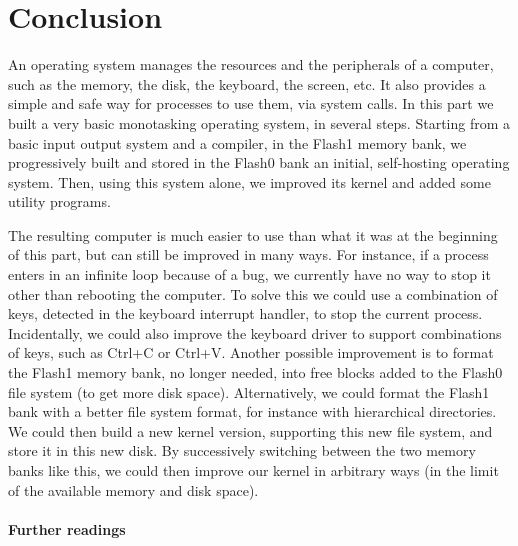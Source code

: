 
\chapter*{Conclusion}

An operating system manages the resources and the peripherals of a computer,
such as the memory, the disk, the keyboard, the screen, etc. It also provides a
simple and safe way for processes to use them, via system calls. In this part
we built a very basic monotasking operating system, in several steps. Starting
from a basic input output system and a compiler, in the Flash1 memory bank, we
progressively built and stored in the Flash0 bank an initial, self-hosting
operating system. Then, using this system alone, we improved its kernel and
added some utility programs.

The resulting computer is much easier to use than what it was at the beginning
of this part, but can still be improved in many ways. For instance, if a
process enters in an infinite loop because of a bug, we currently have no way
to stop it other than rebooting the computer. To solve this we could use a
combination of keys, detected in the keyboard interrupt handler, to stop the
current process. Incidentally, we could also improve the keyboard driver to
support combinations of keys, such as Ctrl+C or Ctrl+V. Another possible
improvement is to format the Flash1 memory bank, no longer needed, into free
blocks added to the Flash0 file system (to get more disk space). Alternatively,
we could format the Flash1 bank with a better file system format, for instance
with hierarchical directories. We could then build a new kernel version,
supporting this new file system, and store it in this new disk. By successively
switching between the two memory banks like this, we could then improve our
kernel in arbitrary ways (in the limit of the available memory and disk space).

\subsubsection{Further readings}

